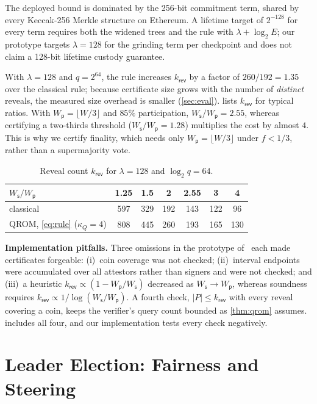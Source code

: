 \documentclass[10pt,journal,compsoc]{IEEEtran}
\theoremstyle{tplain}
\theoremstyle{tdef}
\theoremstyle{remark}
\newcommand{\Ws}{W_{\mathsf{s}}}
\newcommand{\Wp}{W_{\mathsf{p}}}
\newcommand{\kr}{k_{\mathsf{rev}}}
\begin{document}
\noindent The deployed bound is dominated by the 256-bit commitment term, shared by every Keccak-256 Merkle structure on Ethereum. A lifetime target of $2^{-128}$ for every term requires both the widened trees and the rule with $\lambda+\log_2 E$; our prototype targets $\lambda=128$ for the grinding term per checkpoint and does not claim a 128-bit lifetime custody guarantee.

With $\lambda=128$ and $q=2^{64}$, the rule increases $\kr$ by a factor of $260/192=1.35$ over the classical rule; because certificate size grows with the number of \emph{distinct} reveals, the measured size overhead is smaller (\cref{sec:eval}).  lists $\kr$ for typical ratios. With $\Wp=\lfloor W/3\rfloor$ and $85\%$ participation, $\Ws/\Wp=2.55$, whereas certifying a two-thirds threshold ($\Ws/\Wp=1.28$) multiplies the cost by almost $4$. This is why we certify finality, which needs only $\Wp=\lfloor W/3\rfloor$ under $f<1/3$, rather than a supermajority vote.

\begin{table}[t]
\centering
\caption{Reveal count $\kr$ for $\lambda=128$ and $\log_2 q=64$.}
\label{tab:kr}
\scriptsize
\begin{tabular}{@{}lcccccc@{}}
\toprule
$\Ws/\Wp$ & 1.25 & 1.5 & 2 & 2.55 & 3 & 4\\
\midrule
classical~\cite{micali2020compact} & 597 & 329 & 192 & 143 & 122 & 96\\
QROM, \cref{eq:rule} ($\kappa_Q{=}4$) & 808 & 445 & 260 & 193 & 165 & 130\\
\bottomrule
\end{tabular}
\end{table}

\noindent\textbf{Implementation pitfalls.}\label{sec:impl} Three omissions in the prototype of~\cite{NIROPoK2025} each made certificates forgeable: (i)~coin coverage was not checked; (ii)~interval endpoints were accumulated over all attestors rather than signers and were not checked; and (iii)~a heuristic $\kr\propto(1-\Wp/\Ws)$ decreased as $\Ws\to\Wp$, whereas soundness requires $\kr\propto 1/\log(\Ws/\Wp)$. A fourth check, $|P|\le\kr$ with every reveal covering a coin, keeps the verifier's query count bounded as \cref{thm:qrom} assumes.  includes all four, and our implementation tests every check negatively.

\section{Leader Election: Fairness and Steering}\label{sec:consensus}
\end{document}
